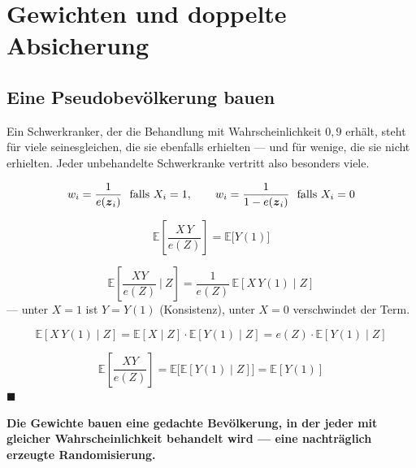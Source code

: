 \chapter{Gewichten und doppelte Absicherung}

\section{Eine Pseudobevölkerung bauen}

\begin{merksatz}
Ein Schwerkranker, der die Behandlung mit Wahrscheinlichkeit $0{,}9$ erhält, steht für viele seinesgleichen, die sie ebenfalls erhielten --- und für wenige, die sie nicht erhielten. Jeder unbehandelte Schwerkranke vertritt also besonders viele.

\begin{definition}
\[ w_i = \frac{1}{e(\boldsymbol{z}_i)} \ \text{ falls } X_i = 1, \qquad w_i = \frac{1}{1-e(\boldsymbol{z}_i)} \ \text{ falls } X_i = 0 \]
\end{definition}

\[ \mathbb{E}\left[\frac{X\,Y}{e(Z)}\right] = \mathbb{E}\bigl[Y(1)\bigr] \]

\[ \mathbb{E}\left[\frac{XY}{e(Z)} \ \bigg|\ Z\right] = \frac{1}{e(Z)}\,\mathbb{E}[X\,Y(1) \mid Z] \]
--- unter $X=1$ ist $Y = Y(1)$ (Konsistenz), unter $X=0$ verschwindet der Term.

\[ \mathbb{E}[X\,Y(1) \mid Z] = \mathbb{E}[X\mid Z]\cdot\mathbb{E}[Y(1)\mid Z] = e(Z)\cdot\mathbb{E}[Y(1)\mid Z] \]

\[ \mathbb{E}\left[\frac{XY}{e(Z)}\right] = \mathbb{E}\bigl[\mathbb{E}[Y(1)\mid Z]\bigr] = \mathbb{E}[Y(1)] \]
$\blacksquare$

\begin{center}
\begin{minipage}{0.9\textwidth}
\textbf{Die Gewichte bauen eine gedachte Bevölkerung, in der jeder mit gleicher Wahrscheinlichkeit behandelt wird --- eine nachträglich erzeugte Randomisierung.}
\end{minipage}
\end{center}

\begin{center}
\begin{minipage}{0.88\textwidth}
\end{minipage}
\end{center}
\end{merksatz}

